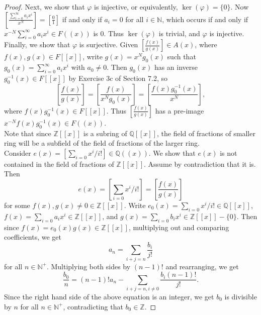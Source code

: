 \documentclass{article}
\begin{document}
\begin{proof}
    Next, we show that $\varphi$ is injective, or equivalently,
    $\ker(\varphi)=\{0\}$. Now $\left[\frac{\sum_{i=0}^\infty
    a_ix^i}{x^N}\right]=\left[\frac{0}{1}\right]$ if and only if $a_i=0$
    for all $i\in\mathbb{N}$, which occurs if and only if
    $x^{-N}\sum_{i=0}^\infty a_ix^i\in F((x))$ is 0. Thus $\ker(\varphi)$
    is trivial, and $\varphi$ is injective. \\

    Finally, we show that $\varphi$ is surjective. Given
    $\left[\frac{f(x)}{g(x)}\right]\in A(x)$, where $f(x),g(x)\in F[[x]]$,
    write $g(x)=x^N g_0(x)$ such that $g_0(x)=\sum_{i=0}^\infty a_ix^i$
    with $a_0\neq0$. Then $g_0(x)$ has an inverse $g_0^{-1}(x)\in F[[x]]$
    by Exercise 3c of Section 7.2, so \[\left[\frac{f(x)}{g(x)}\right]
    =\left[\frac{f(x)}{x^Ng_0(x)}\right]
    =\left[\frac{f(x)g_0^{-1}(x)}{x^N}\right],\] where $f(x)g_0^{-1}(x)\in
    F[[x]]$. Thus $\left[\frac{f(x)}{g(x)}\right]$ has a pre-image
    $x^{-N}f(x)g_0^{-1}(x)\in F((x))$. \\

    Note that since $\mathbb{Z}[[x]]$ is a subring of $\mathbb{Q}[[x]]$,
    the field of fractions of smaller ring will be a subfield of the field
    of fractions of the larger ring. \\

    Consider $e(x)=\left[\sum_{i=0}x^i/i!\right]\in\mathbb{Q}((x))$. We
    show that $e(x)$ is not contained in the field of fractions of
    $\mathbb{Z}[[x]]$. Assume by contradiction that it is. Then
    \[e(x) =\left[\sum_{i=0}x^i/i!\right] =\left[\frac{f(x)}{g(x)}\right]\]
    for some $f(x),g(x)\neq0\in\mathbb{Z}[[x]]$. Write
    $e_0(x)=\sum_{i=0}x^i/i!\in\mathbb{Q}[[x]]$,
    $f(x)=\sum_{i=0}a_ix^i\in\mathbb{Z}[[x]]$, and
    $g(x)=\sum_{i=0}b_ix^i\in\mathbb{Z}[[x]]-\{0\}$. Then since
    $f(x)=e_0(x)g(x)\in\mathbb{Z}[[x]]$, multiplying out and comparing
    coefficients, we get \[a_n=\sum_{i+j=n}\frac{b_i}{j!}\] for all
    $n\in\mathbb{N}^+$. Multiplying both sides by $(n-1)!$ and rearranging,
    we get
    \[\frac{b_0}{n}=(n-1)!a_n-\sum_{i+j=n,i\neq0}\frac{b_i(n-1)!}{j!}.\]
    Since the right hand side of the above equation is an integer, we get
    $b_0$ is divisible by $n$ for all $n\in\mathbb{N}^+$, contradicting
    that $b_0\in\mathbb{Z}$.
  \end{proof}
\end{document}
